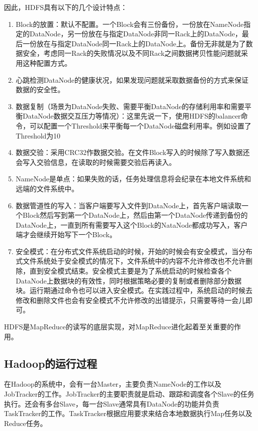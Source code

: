 因此，HDFS具有以下的几个设计特点：

\begin{enumerate}
\item Block的放置：默认不配置。一个Block会有三份备份，一份放在NameNode指定的DataNode，另一份放在与指定DataNode非同一Rack上的DataNode，最后一份放在与指定DataNode同一Rack上的DataNode上。备份无非就是为了数据安全，考虑同一Rack的失败情况以及不同Rack之间数据拷贝性能问题就采用这种配置方式。
\item 心跳检测DataNode的健康状况，如果发现问题就采取数据备份的方式来保证数据的安全性。
\item 数据复制（场景为DataNode失败、需要平衡DataNode的存储利用率和需要平衡DataNode数据交互压力等情况）：这里先说一下，使用HDFS的balancer命令，可以配置一个Threshold来平衡每一个DataNode磁盘利用率。例如设置了Threshold为10%
\item 数据交验：采用CRC32作数据交验。在文件Block写入的时候除了写入数据还会写入交验信息，在读取的时候需要交验后再读入。
\item NameNode是单点：如果失败的话，任务处理信息将会纪录在本地文件系统和远端的文件系统中。
\item 数据管道性的写入：当客户端要写入文件到DataNode上，首先客户端读取一个Block然后写到第一个DataNode上，然后由第一个DataNode传递到备份的DataNode上，一直到所有需要写入这个Block的NataNode都成功写入，客户端才会继续开始写下一个Block。
\item 安全模式：在分布式文件系统启动的时候，开始的时候会有安全模式，当分布式文件系统处于安全模式的情况下，文件系统中的内容不允许修改也不允许删除，直到安全模式结束。安全模式主要是为了系统启动的时候检查各个DataNode上数据块的有效性，同时根据策略必要的复制或者删除部分数据块。运行期通过命令也可以进入安全模式。在实践过程中，系统启动的时候去修改和删除文件也会有安全模式不允许修改的出错提示，只需要等待一会儿即可。
\end{enumerate}

HDFS是MapReduce的读写的底层实现，对MapReduce进化起着至关重要的作用。

\subsection{Hadoop的运行过程}
在Hadoop的系统中，会有一台Master，主要负责NameNode的工作以及JobTracker的工作。JobTracker的主要职责就是启动、跟踪和调度各个Slave的任务执行。还会有多台Slave，每一台Slave通常具有DataNode的功能并负责TaskTracker的工作。TaskTracker根据应用要求来结合本地数据执行Map任务以及Reduce任务。

